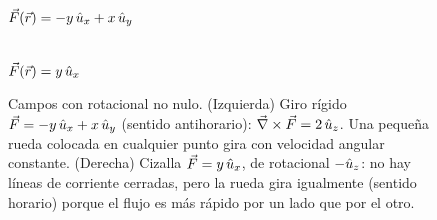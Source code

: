 \begin{figure}[ht]
\centering
\begin{minipage}[t]{0.47\textwidth}\centering
{}\\[3pt]{\small $\vec{F}(\vec{r})=-y\,\hat{u}_{x}+x\,\hat{u}_{y}$}
\end{minipage}\hfill
\begin{minipage}[t]{0.47\textwidth}\centering
{}\\[3pt]{\small $\vec{F}(\vec{r})=y\,\hat{u}_{x}$}
\end{minipage}
\caption{Campos con rotacional no nulo. (Izquierda) Giro rígido
$\vec{F}=-y\,\hat{u}_{x}+x\,\hat{u}_{y}$ (sentido antihorario): $\vec{\nabla}\times\vec{F}=2\,\hat{u}_{z}$. Una
pequeña rueda colocada en cualquier punto gira con velocidad angular
constante. (Derecha) Cizalla $\vec{F}=y\,\hat{u}_{x}$, de rotacional $-\hat{u}_{z}$: no hay
líneas de corriente cerradas, pero la rueda gira igualmente (sentido horario)
porque el flujo es más rápido por un lado que por el otro.}
\label{fig:campos_rot}
\end{figure}
